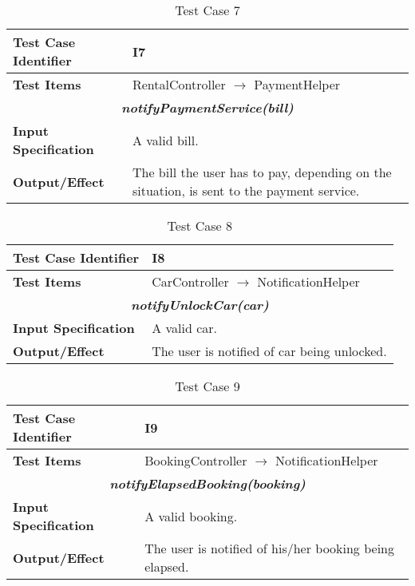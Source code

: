 \begin{table}[h]
	\begin{tabularx}{\textwidth}{l X}
		\hline
		\textbf{Test Case Identifier}	&	I7\\	\hline
		\textbf{Test Items}			&	RentalController $\rightarrow$ PaymentHelper \\	\hline\hline
		\multicolumn{2}{c}{\textbf{\textit{notifyPaymentService(bill)}}}	\\	\hline
			\textbf{Input Specification}	&	A valid bill.\\	\hline
			\textbf{Output/Effect}	&	The bill the user has to pay, depending on the situation, is sent to the payment service.\\	\hline
	\end{tabularx}
	\captionsetup{textformat=empty,labelformat=blank}
	\caption{Test Case 7}
	\label{table:template-table-7}
\end{table}

\begin{table}[h]
	\begin{tabularx}{\textwidth}{l X}
		\hline
		\textbf{Test Case Identifier}	&	I8\\	\hline
		\textbf{Test Items}			&	CarController $\rightarrow$ NotificationHelper \\	\hline\hline
		\multicolumn{2}{c}{\textbf{\textit{notifyUnlockCar(car)}}}	\\	\hline
			\textbf{Input Specification}	&	A valid car.\\	\hline
			\textbf{Output/Effect}	&	The user is notified of car being unlocked.\\	\hline
	\end{tabularx}
	\captionsetup{textformat=empty,labelformat=blank}
	\caption{Test Case 8}
	\label{table:template-table-8}
\end{table}

\begin{table}[h]
	\begin{tabularx}{\textwidth}{l X}
		\hline
		\textbf{Test Case Identifier}	&	I9\\	\hline
		\textbf{Test Items}			&	BookingController $\rightarrow$ NotificationHelper \\	\hline\hline
		\multicolumn{2}{c}{\textbf{\textit{notifyElapsedBooking(booking)}}}	\\	\hline
			\textbf{Input Specification}	&	A valid booking.\\	\hline
			\textbf{Output/Effect}	&	The user is notified of his/her booking being elapsed.\\	\hline
	\end{tabularx}
	\captionsetup{textformat=empty,labelformat=blank}
	\caption{Test Case 9}
	\label{table:template-table-9}
\end{table}


